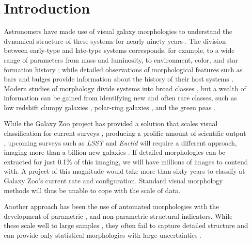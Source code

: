 \documentclass[twocolumn]{aastex6}
\begin{document}
\section{Introduction} \label{sec:intro}

Astronomers have made use of visual galaxy morphologies to understand the dynamical structure of these systems for nearly ninety years 
\citep[e.g.,][]{Hubble1936, 
			deVauc1959, 
			Sandage1961, 
			vandenBergh1976, 
			NairAbraham2010, 
			Baillard2011}. 
The division between early-type and late-type systems corresponds, for example, to a wide range of parameters from mass and luminosity, to environment, color, and star formation history 
\citep[e.g.,][]{Kormendy1977,  
			Dressler1980, 
			Strateva2001, 
			Blanton2003, 
			Kauffman2003, 
			Nakamura2003, 
			Shen2003, 
			Peng2010}; 
while detailed observations of morphological features such as bars and bulges 
provide information about the history of their host systems 
\citep[e.g., review by][]{KK04, 
			Elmegreen2008, 
			Sheth2008, 
			Masters2010, 
			Simmons2014}. 
Modern studies of morphology  divide systems into broad classes 
\citep[e.g.,][]{Conselice2006, 
			Lintott2008, 
			Kartaltepe2015, 
			Peth2016}, 
but a wealth of information can be gained from identifying new and often rare classes, 
such as low redshift clumpy galaxies \citep[e.g.,][]{Elmegreen2013}, polar-ring galaxies \citep[e.g.,][]{Whitmore1990}, and the green peas \citep{Cardamone2009}. 


While the Galaxy Zoo project has provided a solution that scales visual classification 
for current surveys \citep{Lintott2008, Lintott2011, Willett2013, Willett2017, Simmons2017}, 
producing a prolific amount of scientific output \citep[e.g.,][]{Land2008, Bamford2009, Darg2010, Schawinski2014, Galloway2015, Smethurst2016}, 
upcoming surveys such as \textit{LSST} and \textit{Euclid}
will require a different approach, imaging more than a billion new galaxies  \citep{LSST, Euclid}. 
If detailed morphologies can be extracted for just  0.1\% of this imaging, we will 
have millions of images to contend with. A project of this magnitude would take more than 
sixty years to classify at Galaxy Zoo's current rate and configuration. Standard visual morphology     
methods will thus be unable to cope with the scale of data. 

Another approach has been the use of automated morphologies with the development
of parametric \citep{Sersic1968, Odewahn2002, Peng2002}, 
and non-parametric \citep{Abraham1994, Conselice2003, Abraham2003, Lotz2004, Freeman2013} 
structural indicators. While these scale well to large samples 
\citep[e.g.,][]{	Simard2011, 
			Griffith2012, 
			Casteels2014, 
			Holwerda2014, 
			Meert2016}, 
they often fail to capture detailed structure and can 
provide only statistical morphologies with large uncertainties \cite[e.g.,][]{Abraham1996, Bershady2000}. 
\end{document}
